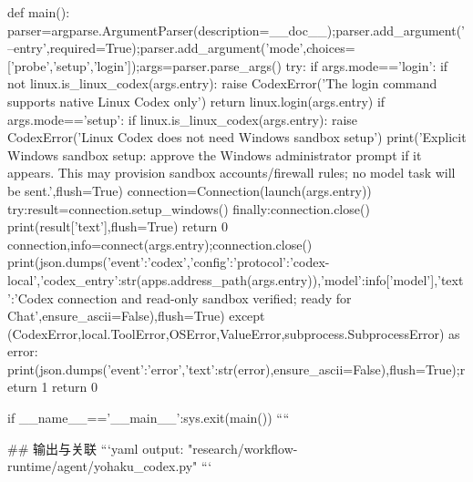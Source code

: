def main():
    parser=argparse.ArgumentParser(description=__doc__);parser.add_argument('--entry',required=True);parser.add_argument('mode',choices=['probe','setup','login']);args=parser.parse_args()
    try:
        if args.mode=='login':
            if not linux.is_linux_codex(args.entry):
                raise CodexError('The login command supports native Linux Codex only')
            return linux.login(args.entry)
        if args.mode=='setup':
            if linux.is_linux_codex(args.entry):
                raise CodexError('Linux Codex does not need Windows sandbox setup')
            print('Explicit Windows sandbox setup: approve the Windows administrator prompt if it appears. This may provision sandbox accounts/firewall rules; no model task will be sent.',flush=True)
            connection=Connection(launch(args.entry))
            try:result=connection.setup_windows()
            finally:connection.close()
            print(result['text'],flush=True)
            return 0
        connection,info=connect(args.entry);connection.close()
        print(json.dumps({'event':'codex','config':{'protocol':'codex-local','codex_entry':str(apps.address_path(args.entry)),'model':info['model']},'text':'Codex connection and read-only sandbox verified; ready for Chat'},ensure_ascii=False),flush=True)
    except (CodexError,local.ToolError,OSError,ValueError,subprocess.SubprocessError) as error:
        print(json.dumps({'event':'error','text':str(error)},ensure_ascii=False),flush=True);return 1
    return 0

if __name__=='__main__':sys.exit(main())
````

## 输出与关联
```yaml
output: "research/workflow-runtime/agent/yohaku_codex.py"
```
